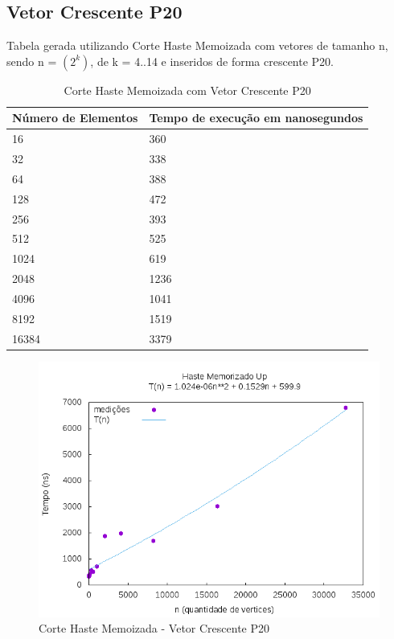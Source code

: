 \documentclass[12pt,a4paper,twoside]{report}
\begin{document}
\subsection{Vetor Crescente P20}
Tabela gerada utilizando Corte Haste Memoizada com vetores de tamanho n, sendo n = $(2^k)$, de k = 4..14 e inseridos de forma crescente P20.
\begin{table}[H]
\centering
\caption{Corte Haste Memoizada com Vetor Crescente P20}
\label{my-label}
\begin{tabular}{|l|l|}
\hline
\multicolumn{1}{|c|}{\textbf{Número de Elementos}} & \multicolumn{1}{c|}{\textbf{Tempo de execução em nanosegundos}} \\ \hline
16 & 360 \\ \hline
32 & 338 \\ \hline
64 & 388 \\ \hline
128 & 472 \\ \hline
256 & 393 \\ \hline
512 & 525 \\ \hline
1024 & 619 \\ \hline
2048 & 1236 \\ \hline
4096 & 1041 \\ \hline
8192 & 1519 \\ \hline
16384 & 3379 \\ \hline

\end{tabular}
\end{table}

\begin{figure}[H]
    \centering
    \includegraphics[width=0.7\linewidth]{graficos/CorteHasteMemorizado/CrescenteP20/HasteMemo.png}
  \caption{Corte Haste Memoizada - Vetor Crescente P20}
\end{figure}
\end{document}
